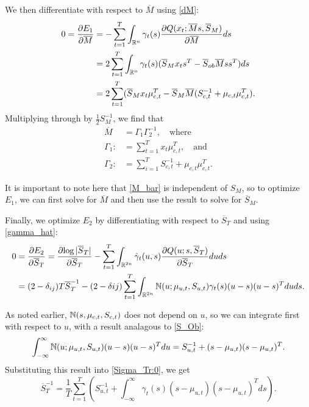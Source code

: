 \documentclass[12pt,leqno]{article}
\begin{document}
We then differentiate with respect to $\overline{M}$ using \eqref{dM}:
\begin{align*}
  0 = \frac{\partial{E_1}}{\partial{\overline{M}}} &=
  - \sum_{t=1}^T\int_{{\mathbb R}^n}\gamma_t(s)\frac{\partial{Q(x_t;\overline{M}s,\overline{S}_M)}}{\partial{\overline{M}}}ds \\
  &= 2\sum_{t=1}^T\int_{{\mathbb R}^n}\gamma_t(s)(\overline{S}_Mx_ts^T - \overline{S}_{ob}\overline{M}ss^T)ds \\
  &= 2\sum_{t=1}^T(\overline{S}_Mx_t\mu_{c,t}^T - \overline{S}_M\overline{M}(S_{c,t}^{-1} + \mu_{c,t}\mu_{c,t}^T).
\end{align*}
Multiplying through by $\frac{1}{2}S_M^{-1}$, we find that
\begin{equation}\label{M_bar}
  \begin{split}
    \overline{M} &= \Gamma_1\Gamma_2^{-1}, \quad\text{where}\\
    \Gamma_1 :&= \sum_{t=1}^Tx_t\mu_{c,t}^T, \quad\text{and}\\
    \Gamma_2 :&= \sum_{i=1}^TS_{c,t}^{-1} + \mu_{c,t}\mu_{c,t}^T.
  \end{split}
\end{equation}

It is important to note here that \eqref{M_bar} is independent of $S_M$, so to optimize $E_1$, we can first
solve for $\overline{M}$ and then use the result to solve for $\overline{S}_M$.  

Finally, we optimize $E_2$ by differentiating with respect to $\overline{S}_T$ and using \eqref{gamma_hat}:
\begin{equation}\label{Sigma_Tr:0}
  \begin{split}
  0 &= \frac{\partial{E_2}}{\partial{\overline{S}_T}} = \frac{\partial{\log|\overline{S}_T|}}{\partial\overline{S}_T}
  - \sum_{t=1}^T\int_{{\mathbb R}^{2n}}\hat{\gamma}_t(u,s)\frac{\partial{Q(u;s,\overline{S}_T)}}{\partial\overline{S}_T}duds \\
      &= (2-\delta_{ij})T\overline{S}_T^{-1} - (2-\delta{ij}) \sum_{t=1}^T\int_{{\mathbb R}^{2n}}{\mathbb N}(u;\mu_{u,t},S_{u,t})\gamma_t(s)(u-s)(u-s)^Tduds.
  \end{split}
\end{equation}

As noted earlier, ${\mathbb N}(s,\mu_{c,t},S_{c,t})$ does not depend on $u$, so we can integrate first with respect to $u$, with a result
analagous to \eqref{S_Ob}:
$$
  \int_{-\infty}^{\infty}{\mathbb N}(u;\mu_{u,t},S_{u,t})(u-s)(u-s)^Tdu = S_{u,t}^{-1} + (s-\mu_{u,t})(s-\mu_{u,t})^T.
$$
Substituting this result into \eqref{Sigma_Tr:0}, we get
\begin{equation}\label{Sigma_Tr:1}
  \overline{S}_T^{-1} =  \frac{1}{T}\sum_{t=1}^T\left(S_{u,t}^{-1} +\int_{-\infty}^{\infty}\gamma_t(s)
  (s-\mu_{u,t})(s-\mu_{u,t})^Tds\right).
\end{equation}
\end{document}
